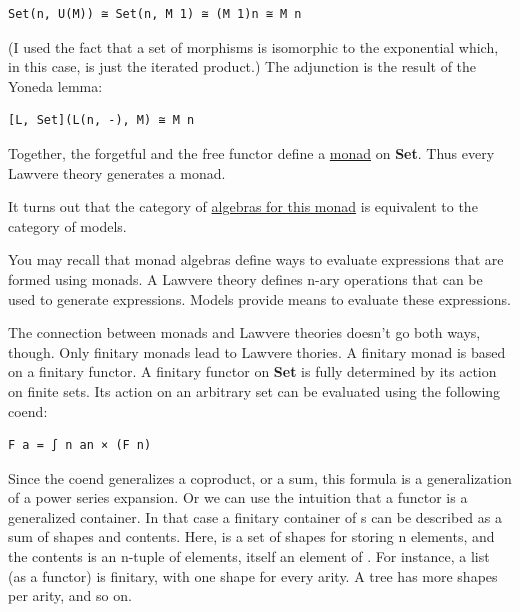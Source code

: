 \begin{Verbatim}[commandchars=\\\{\}]
Set(n, U(M)) ≅ Set(n, M 1) ≅ (M 1)n ≅ M n
\end{Verbatim}

(I used the fact that a set of morphisms is isomorphic to the
exponential which, in this case, is just the iterated product.) The
adjunction is the result of the Yoneda lemma:

\begin{Verbatim}[commandchars=\\\{\}]
[L, Set](L(n, -), M) ≅ M n
\end{Verbatim}

Together, the forgetful and the free functor define a
\href{https://bartoszmilewski.com/2016/12/27/monads-categorically/}{monad}
 on \textbf{Set}. Thus every Lawvere theory generates
a monad.

It turns out that the category of
\href{https://bartoszmilewski.com/2017/03/14/algebras-for-monads/}{algebras
for this monad} is equivalent to the category of models.

You may recall that monad algebras define ways to evaluate expressions
that are formed using monads. A Lawvere theory defines n-ary operations
that can be used to generate expressions. Models provide means to
evaluate these expressions.

The connection between monads and Lawvere theories doesn't go both ways,
though. Only finitary monads lead to Lawvere thories. A finitary monad
is based on a finitary functor. A finitary functor on \textbf{Set} is
fully determined by its action on finite sets. Its action on an
arbitrary set  can be evaluated using the following coend:

\begin{Verbatim}[commandchars=\\\{\}]
F a = ∫ n an × (F n)
\end{Verbatim}

Since the coend generalizes a coproduct, or a sum, this formula is a
generalization of a power series expansion. Or we can use the intuition
that a functor is a generalized container. In that case a finitary
container of s can be described as a sum of shapes and
contents. Here,  is a set of shapes for storing n elements,
and the contents is an n-tuple of elements, itself an element of
. For instance, a list (as a functor) is finitary, with one
shape for every arity. A tree has more shapes per arity, and so on.

